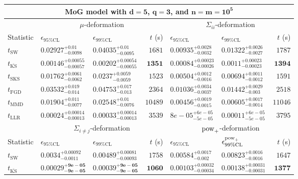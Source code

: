\begin{tabular}{l|llr|llr}
	\toprule
	\multicolumn{7}{c}{{\bf MoG model with $\mathbf{d=5}$, $\mathbf{q=3}$, and $\mathbf{n=m=10^{5}}$}} \\
	\toprule
	\multicolumn{1}{c}{} & \multicolumn{3}{c}{$\mu$-deformation} & \multicolumn{3}{c}{$\Sigma_{ii}$-deformation} \\
	Statistic & $\epsilon_{95\%\mathrm{CL}}$ & $\epsilon_{99\%\mathrm    {CL}}$ & $t$ (s) & $\epsilon_{95\%\mathrm{CL}}$ & $\epsilon_{99\%\mathrm{CL}}$ & $t$ (s) \\
	\midrule
	$t_{\mathrm{SW}}$ & $0.02927_{-0.0098}^{+0.01}$ & $0.04035_{-0.0095}^{+0.01}$ & $1681$ & $0.00935_{-0.0032}^{+0.0028}$ & $0.01322_{-0.0027}^{+0.0026}$ & $1787$ \\
	$t_{\overline{\mathrm{KS}}}$ & ${\mathbf{0.00146_{-0.00057}^{+0.00055}}}$ & ${\mathbf{0.00202_{-0.00055}^{+0.00054}}}$ & ${\mathbf{1351}}$ & ${\mathbf{0.00084_{-0.00026}^{+0.00023}}}$ & ${\mathbf{0.0011_{-0.00023}^{+0.00023}}}$ & ${\mathbf{1394}}$ \\
	$t_{\mathrm{SKS}}$ & $0.01762_{-0.0062}^{+0.0061}$ & $0.0237_{-0.0059}^{+0.0059}$ & $1523$ & $0.00504_{-0.0016}^{+0.0012}$ & $0.00694_{-0.0012}^{+0.0011}$ & $1591$ \\
	$t_{\mathrm{FGD}}$ & $0.03532_{-0.014}^{+0.019}$ & $0.04753_{-0.013}^{+0.017}$ & $2364$ & $0.01036_{-0.0037}^{+0.0034}$ & $0.01442_{-0.003}^{+0.0029}$ & $2518$ \\
	$t_{\mathrm{MMD}}$ & $0.01904_{-0.0077}^{+0.011}$ & $0.02548_{-0.0076}^{+0.01}$ & $10489$ & $0.00456_{-0.0015}^{+0.0019}$ & $0.00605_{-0.0014}^{+0.0017}$ & $11046$ \\
	$t_{\mathrm{LLR}}$ & $0.00024_{-0.00013}^{+0.00014}$ & $0.00033_{-0.00013}^{+0.00014}$ & $3539$ & $8e-05_{-5e-05}^{+6e-05}$ & $0.00011_{-5e-05}^{+6e-05}$ & $3795$ \\
	\toprule
	\multicolumn{1}{c}{} & \multicolumn{3}{c}{$\Sigma_{i\neq j}$-deformation} & \multicolumn{3}{c}{$\rm{pow}_{+}$-deformation} \\
	Statistic & $\epsilon_{95\%\mathrm{CL}}$ & $\epsilon_{99\%\mathrm{CL}}$ & $t$ (s) & $\epsilon_{95\%\mathrm{CL}}$ & $\epsilon^{\rm   {pow}_{+}}_{99\%\mathrm{CL}}$ & $t$ (s) \\
	\midrule
	$t_{\mathrm{SW}}$ & $0.0034_{-0.0011}^{+0.00092}$ & $0.00489_{-0.00093}^{+0.00081}$ & $1758$ & $0.00584_{-0.002}^{+0.0017}$ & $0.00823_{-0.0016}^{+0.0016}$ & $1647$ \\
	$t_{\overline{\mathrm{KS}}}$ & ${\mathbf{0.00029_{-9e-05}^{+9e-05}}}$ & ${\mathbf{0.00039_{-9e-05}^{+9e-05}}}$ & ${\mathbf{1060}}$ & ${\mathbf{0.00103_{-0.00034}^{+0.00032}}}$ & ${\mathbf{0.00138_{-0.00031}^{+0.00031}}}$ & ${\mathbf{1377}}$ \\

\end{tabular}
